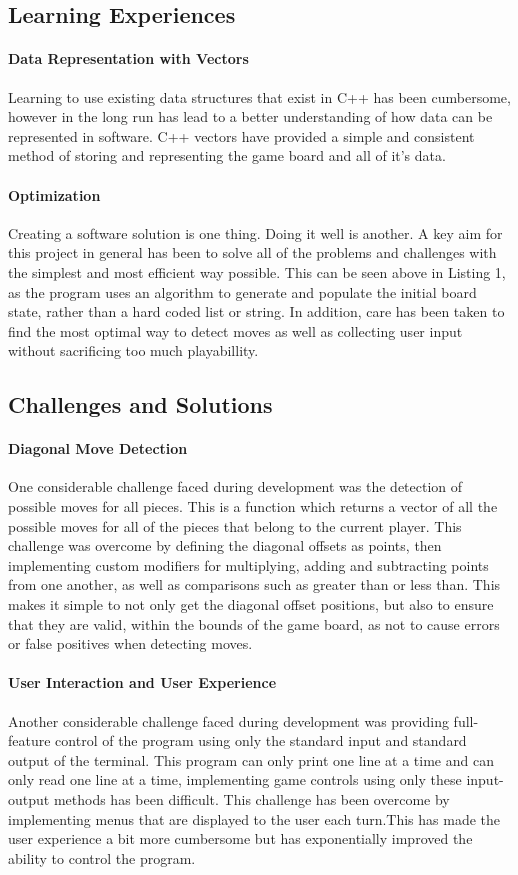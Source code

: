 \documentclass[10pt, a4paper]{article}
\begin{document}
	\subsection{Learning Experiences}
	\paragraph{Data Representation with Vectors}
	Learning to use existing data structures that exist in C++ has been cumbersome, however in the long run has lead to a better understanding of how data can be represented in software. C++ vectors have provided a simple and consistent method of storing and representing the game board and all of it's data. 
	\paragraph{Optimization}
	Creating a software solution is one thing. Doing it well is another. A key aim for this project in general has been to solve all of the problems and challenges with the simplest and most efficient way possible. This can be seen above in Listing 1, as the program uses an algorithm to generate and populate the initial board state, rather than a hard coded list or string. In addition, care has been taken to find the most optimal way to detect moves as well as collecting user input without sacrificing too much playabillity. 
	
	\subsection{Challenges and Solutions}
	\paragraph{Diagonal Move Detection}
	One considerable challenge faced during development was the detection of possible moves for all pieces. This is a function which returns a vector of all the possible moves for all of the pieces that belong to the current player. This challenge was overcome by defining the diagonal offsets as points, then implementing custom modifiers for multiplying, adding and subtracting points from one another, as well as comparisons such as greater than or less than. This makes it simple to not only get the diagonal offset positions, but also to ensure that they are valid, within the bounds of the game board, as not to cause errors or false positives when detecting moves.
	\paragraph{User Interaction and User Experience}
	Another considerable challenge faced during development was providing full-feature control of the program using only the standard input and standard output of the terminal. This program can only print one line at a time and can only read one line at a time, implementing game controls using only these input-output methods has been difficult. This challenge has been overcome by implementing menus that are displayed to the user each turn.This has made the user experience a bit more cumbersome but has exponentially improved the ability to control the program.
\end{document}
